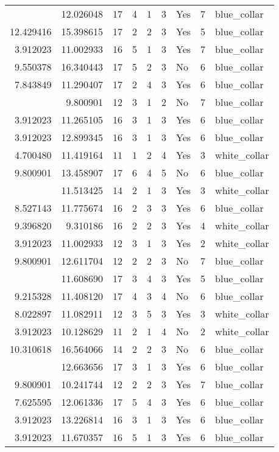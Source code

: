 \documentclass[
]{article}
\begin{document}
\begin{longtable}[t]{rrrrrllrl}
\addlinespace
3.912023 & 12.026048 & 17 & 4 & 1 & 3 & Yes & 7 & blue\_collar\\
12.429416 & 15.398615 & 17 & 2 & 2 & 3 & Yes & 5 & blue\_collar\\
3.912023 & 11.002933 & 16 & 5 & 1 & 3 & Yes & 7 & blue\_collar\\
9.550378 & 16.340443 & 17 & 5 & 2 & 3 & No & 6 & blue\_collar\\
7.843849 & 11.290407 & 17 & 2 & 4 & 3 & Yes & 6 & blue\_collar\\
\addlinespace
3.912023 & 9.800901 & 12 & 3 & 1 & 2 & No & 7 & blue\_collar\\
3.912023 & 11.265105 & 16 & 3 & 1 & 3 & Yes & 6 & blue\_collar\\
3.912023 & 12.899345 & 16 & 3 & 1 & 3 & Yes & 6 & blue\_collar\\
4.700480 & 11.419164 & 11 & 1 & 2 & 4 & Yes & 3 & white\_collar\\
9.800901 & 13.458907 & 17 & 6 & 4 & 5 & No & 6 & blue\_collar\\
\addlinespace
3.912023 & 11.513425 & 14 & 2 & 1 & 3 & Yes & 3 & white\_collar\\
8.527143 & 11.775674 & 16 & 2 & 3 & 3 & Yes & 6 & blue\_collar\\
9.396820 & 9.310186 & 16 & 2 & 2 & 3 & Yes & 4 & white\_collar\\
3.912023 & 11.002933 & 12 & 3 & 1 & 3 & Yes & 2 & white\_collar\\
9.800901 & 12.611704 & 12 & 2 & 2 & 3 & No & 7 & blue\_collar\\
\addlinespace
12.043848 & 11.608690 & 17 & 3 & 4 & 3 & Yes & 5 & blue\_collar\\
9.215328 & 11.408120 & 17 & 4 & 3 & 4 & No & 6 & blue\_collar\\
8.022897 & 11.082911 & 12 & 3 & 5 & 3 & Yes & 3 & white\_collar\\
3.912023 & 10.128629 & 11 & 2 & 1 & 4 & No & 2 & white\_collar\\
10.310618 & 16.564066 & 14 & 2 & 2 & 3 & No & 6 & blue\_collar\\
\addlinespace
3.912023 & 12.663656 & 17 & 3 & 1 & 3 & Yes & 6 & blue\_collar\\
9.800901 & 10.241744 & 12 & 2 & 2 & 3 & Yes & 7 & blue\_collar\\
7.625595 & 12.061336 & 17 & 5 & 4 & 3 & Yes & 6 & blue\_collar\\
3.912023 & 13.226814 & 16 & 3 & 1 & 3 & Yes & 6 & blue\_collar\\
3.912023 & 11.670357 & 16 & 5 & 1 & 3 & Yes & 6 & blue\_collar\\

\end{longtable}
\end{document}
